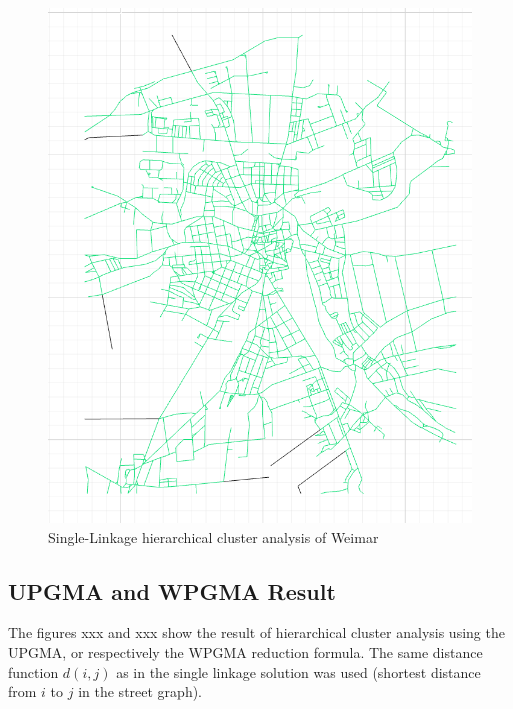 \documentclass[11pt, a4paper]{report}
\begin{document}
\begin{figure}[!h]
    \centering
    \includegraphics[width=\textwidth]{clusteranalysis_singlelinkage.png}
    \caption{Single-Linkage hierarchical cluster analysis of Weimar\label{fig:SingleLinkage}}
\end{figure}

\subsection{UPGMA and WPGMA Result}
\label{sec:UPGMAandWPGMA}
The figures xxx and xxx show the result of hierarchical cluster analysis using the UPGMA, or respectively the WPGMA reduction formula. The same distance function $d(i, j)$ as in the single linkage solution was used (shortest distance from $i$ to $j$ in the street graph).
\end{document}
